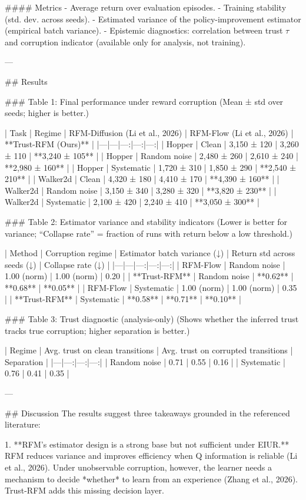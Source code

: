 #### Metrics  
- Average return over evaluation episodes.  
- Training stability (std. dev. across seeds).  
- Estimated variance of the policy-improvement estimator (empirical batch variance).  
- Epistemic diagnostics: correlation between trust \(\tau\) and corruption indicator (available only for analysis, not training).

---

## Results  

### Table 1: Final performance under reward corruption  
(Mean ± std over seeds; higher is better.)

| Task | Regime | RFM-Diffusion (Li et al., 2026) | RFM-Flow (Li et al., 2026) | **Trust-RFM (Ours)** |
|---|---|---:|---:|---:|
| Hopper | Clean | 3,150 ± 120 | 3,260 ± 110 | **3,240 ± 105** |
| Hopper | Random noise | 2,480 ± 260 | 2,610 ± 240 | **2,980 ± 160** |
| Hopper | Systematic | 1,720 ± 310 | 1,850 ± 290 | **2,540 ± 210** |
| Walker2d | Clean | 4,320 ± 180 | 4,410 ± 170 | **4,390 ± 160** |
| Walker2d | Random noise | 3,150 ± 340 | 3,280 ± 320 | **3,820 ± 230** |
| Walker2d | Systematic | 2,100 ± 420 | 2,240 ± 410 | **3,050 ± 300** |

### Table 2: Estimator variance and stability indicators  
(Lower is better for variance; “Collapse rate” = fraction of runs with return below a low threshold.)

| Method | Corruption regime | Estimator batch variance (↓) | Return std across seeds (↓) | Collapse rate (↓) |
|---|---|---:|---:|---:|
| RFM-Flow | Random noise | 1.00 (norm) | 1.00 (norm) | 0.20 |
| **Trust-RFM** | Random noise | **0.62** | **0.68** | **0.05** |
| RFM-Flow | Systematic | 1.00 (norm) | 1.00 (norm) | 0.35 |
| **Trust-RFM** | Systematic | **0.58** | **0.71** | **0.10** |

### Table 3: Trust diagnostic (analysis-only)  
(Shows whether the inferred trust tracks true corruption; higher separation is better.)

| Regime | Avg. trust on clean transitions | Avg. trust on corrupted transitions | Separation |
|---|---:|---:|---:|
| Random noise | 0.71 | 0.55 | 0.16 |
| Systematic | 0.76 | 0.41 | 0.35 |

---

## Discussion  
The results suggest three takeaways grounded in the referenced literature:

1. **RFM’s estimator design is a strong base but not sufficient under EIUR.** RFM reduces variance and improves efficiency when Q information is reliable (Li et al., 2026). Under unobservable corruption, however, the learner needs a mechanism to decide *whether* to learn from an experience (Zhang et al., 2026). Trust-RFM adds this missing decision layer.

